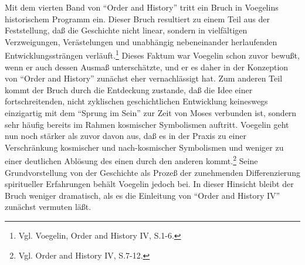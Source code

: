Mit dem vierten Band von "`Order and History"' tritt ein Bruch in Voegelins
historischem Programm ein. Dieser Bruch resultiert zu einem Teil aus der
Feststellung, daß die Geschichte nicht linear, sondern in vielfältigen
Verzweigungen, Verästelungen und unabhängig nebeneinander herlaufenden
Entwicklungssträngen verläuft.\footnote{Vgl. Voegelin, Order and History IV,
  S.1-6.} Dieses Faktum war Voegelin schon zuvor bewußt, wenn er auch dessen
Ausmaß unterschätzte, und er es daher in der Konzeption von "`Order and
History"' zunächst eher vernachlässigt hat. Zum anderen Teil kommt der Bruch
durch die Entdeckung zustande, daß die Idee einer fortschreitenden, nicht
zyklischen geschichtlichen Entwicklung keineswegs einzigartig mit dem "`Sprung
im Sein"' zur Zeit von Moses verbunden ist, sondern sehr häufig bereits im
Rahmen kosmischer Symbolismen auftritt.  Voegelin geht nun noch stärker als
zuvor davon aus, daß es in der Praxis zu einer Verschränkung kosmischer und
nach-kosmischer Symbolismen und weniger zu einer deutlichen Ablösung des einen
durch den anderen kommt.\footnote{Vgl.  Order and History IV, S.7-12.} Seine
Grundvorstellung von der Geschichte als Prozeß der zunehmenden Differenzierung
spiritueller Erfahrungen behält Voegelin jedoch bei. In dieser Hinsicht bleibt
der Bruch weniger dramatisch, als es die Einleitung von "`Order and History
IV"' zunächst vermuten läßt.

